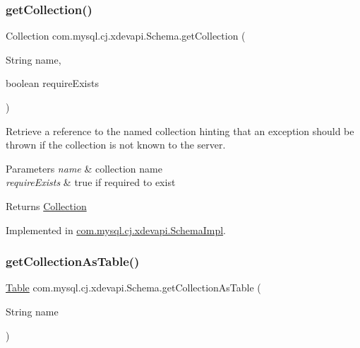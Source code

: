 \subsubsection{\texorpdfstring{get\+Collection()}{getCollection()}\hspace{0.1cm}{\footnotesize\ttfamily [2/2]}}
{\footnotesize\ttfamily Collection com.\+mysql.\+cj.\+xdevapi.\+Schema.\+get\+Collection (\begin{DoxyParamCaption}\item[{String}]{name,  }\item[{boolean}]{require\+Exists }\end{DoxyParamCaption})}

Retrieve a reference to the named collection hinting that an exception should be thrown if the collection is not known to the server.


\begin{DoxyParams}{Parameters}
{\em name} & collection name \\
\hline
{\em require\+Exists} & true if required to exist \\
\hline
\end{DoxyParams}
\begin{DoxyReturn}{Returns}
\mbox{\hyperlink{interfacecom_1_1mysql_1_1cj_1_1xdevapi_1_1_collection}{Collection}} 
\end{DoxyReturn}


Implemented in \mbox{\hyperlink{classcom_1_1mysql_1_1cj_1_1xdevapi_1_1_schema_impl_a465ae06f3ba56080cbc7405ff428f01b}{com.\+mysql.\+cj.\+xdevapi.\+Schema\+Impl}}.

\mbox{\label{interfacecom_1_1mysql_1_1cj_1_1xdevapi_1_1_schema_adaa1920ec971a87acc1173ba0c56f92e}} 
\subsubsection{\texorpdfstring{get\+Collection\+As\+Table()}{getCollectionAsTable()}}
{\footnotesize\ttfamily \mbox{\hyperlink{interfacecom_1_1mysql_1_1cj_1_1xdevapi_1_1_table}{Table}} com.\+mysql.\+cj.\+xdevapi.\+Schema.\+get\+Collection\+As\+Table (\begin{DoxyParamCaption}\item[{String}]{name }\end{DoxyParamCaption})}

